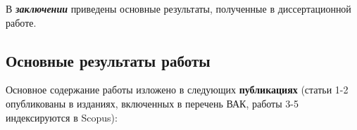 В \textbf{\textit{заключении}} приведены основные результаты, полученные в диссертационной работе.
\subsection*{Основные результаты работы}




\renewcommand*{\refname}{\vspace*{-13mm}}

\renewcommand{\refname}{\large Публикации автора по теме диссертации}
Основное содержание работы изложено в следующих \textbf{публикациях} (статьи 1-2 опубликованы в изданиях, включенных в перечень ВАК, работы 3-5 индексируются в Scopus):
\nocite{*}
\insertbiblioauthor                          %
